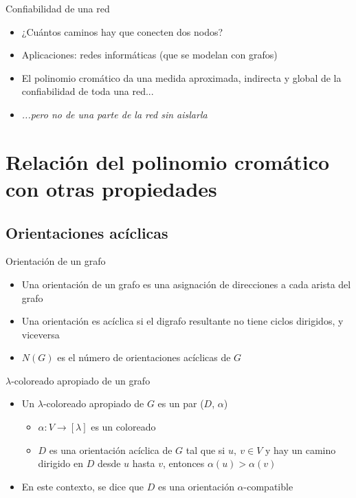 \documentclass{beamer}
\begin{document}
\begin{frame}{Confiabilidad de una red}
    \begin{itemize}
        \item<1-> ¿Cuántos caminos hay que conecten dos nodos?
        \item<1-> Aplicaciones: redes informáticas (que se modelan con grafos)
        \item<2-> El polinomio cromático da una medida aproximada, indirecta y global de la confiabilidad de toda una red...
        \item<3-> \emph{...pero no de una parte de la red sin aislarla}
    \end{itemize}
\end{frame}

\section{Relación del polinomio cromático con otras propiedades}

\subsection{Orientaciones acíclicas}

\begin{frame}{Orientación de un grafo}
    \begin{itemize}
        \item Una orientación de un grafo es una asignación de direcciones a cada arista del grafo
        \item Una orientación es acíclica si el digrafo resultante no tiene ciclos dirigidos, y viceversa
        \item $N(G)$ es el número de orientaciones acíclicas de $G$
    \end{itemize}
\end{frame}

\begin{frame}{$\lambda$-coloreado apropiado de un grafo}
    \begin{itemize}
        \item<1-> Un $\lambda$-coloreado apropiado de $G$ es un par ($D$, $\alpha$)
        \begin{itemize}
            \item $\alpha : V \rightarrow [\lambda]$ es un coloreado
            \item $D$ es una orientación acíclica de $G$ tal que si $u,\ v \in V$ y hay un camino dirigido en $D$ desde $u$ hasta $v$, entonces $\alpha(u) > \alpha(v)$
        \end{itemize}
        \item<2-> En este contexto, se dice que $D$ es una orientación $\alpha$-compatible
    \end{itemize}
\end{frame}
\end{document}
